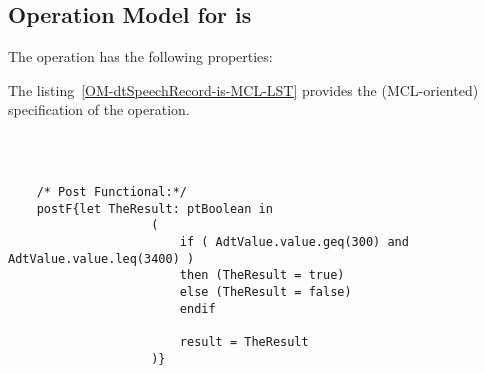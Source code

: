 \subsection{Operation Model for is}

\label{OM-is}


The  operation has the following properties:

	\begin{operationmodel}



		


	\end{operationmodel}



	\vspace{1cm}
	The listing~\ref{OM-dtSpeechRecord-is-MCL-LST} provides the \msrmessir (MCL-oriented) specification of the operation.
	
	\scriptsize
	\vspace{0.5cm}
	\begin{lstlisting}[style=MessirStyle,firstnumber=auto,captionpos=b,caption={\msrmessir (MCL-oriented) specification of the operation \emph{is}.},label=OM-dtSpeechRecord-is-MCL-LST]

	
	
	/* Post Functional:*/ 
	postF{let TheResult: ptBoolean in
			        (
			        	if ( AdtValue.value.geq(300) and AdtValue.value.leq(3400) )
			            then (TheResult = true)
			            else (TheResult = false)
			            endif
			            
			            result = TheResult
			        )}
	
	
	\end{lstlisting}
	\normalsize 
	
	
	
	





